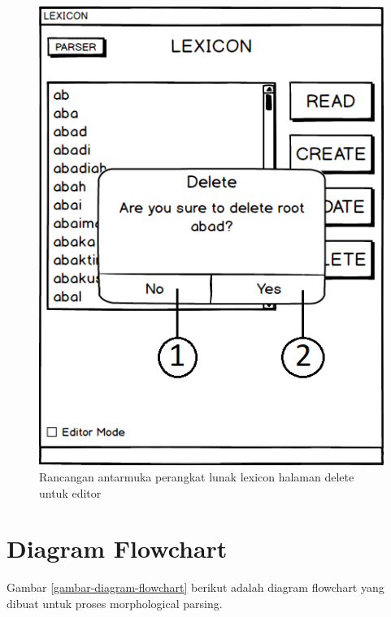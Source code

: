\begin{figure}[H]
\centering
\includegraphics[scale=0.8]{Gambar/mockup-lexicon-delete-editor}
\caption{Rancangan antarmuka perangkat lunak lexicon halaman delete untuk editor} 
\label{mockup-lexicon-delete-editor}
\end{figure}

\section{Diagram Flowchart}
\label{sec:diagramFlowchart}

Gambar \ref{gambar-diagram-flowchart} berikut adalah diagram flowchart yang dibuat untuk proses morphological parsing.


